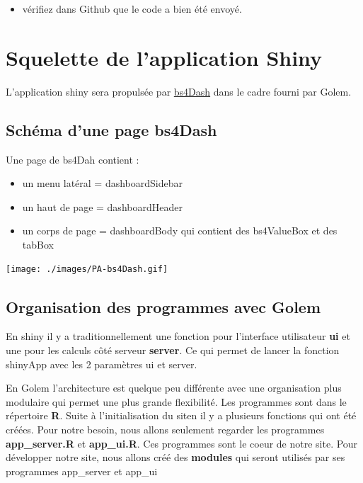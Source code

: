 \documentclass[
  letterpaper,
  DIV=11,
  numbers=noendperiod]{scrreprt}
\providecommand{\tightlist}{%
  \setlength{\itemsep}{0pt}\setlength{\parskip}{0pt}}\usepackage{longtable,booktabs,array}
\begin{document}
\begin{itemize}
\tightlist
\item
  vérifiez dans Github que le code a bien été envoyé.
\end{itemize}


\hypertarget{squelette-de-lapplication-shiny}{%
\chapter{Squelette de l'application
Shiny}\label{squelette-de-lapplication-shiny}}

L'application shiny sera propulsée par
\href{https://rinterface.github.io/bs4Dash/index.html}{bs4Dash} dans le
cadre fourni par Golem.

\hypertarget{schuxe9ma-dune-page-bs4dash}{%
\section{Schéma d'une page bs4Dash}\label{schuxe9ma-dune-page-bs4dash}}

Une page de bs4Dah contient :

\begin{itemize}
\tightlist
\item
  un menu latéral = dashboardSidebar\\
\item
  un haut de page = dashboardHeader\\
\item
  un corps de page = dashboardBody qui contient des bs4ValueBox et des
  tabBox
\end{itemize}

\texttt{[image: ./images/PA-bs4Dash.gif]}

\hypertarget{organisation-des-programmes-avec-golem}{%
\section{Organisation des programmes avec
Golem}\label{organisation-des-programmes-avec-golem}}

En shiny il y a traditionnellement une fonction pour l'interface
utilisateur \textbf{ui} et une pour les calculs côté serveur
\textbf{server}. Ce qui permet de lancer la fonction shinyApp avec les 2
paramètres ui et server.

En Golem l'architecture est quelque peu différente avec une organisation
plus modulaire qui permet une plus grande flexibilité. Les programmes
sont dans le répertoire \textbf{R}. Suite à l'initialisation du siten il
y a plusieurs fonctions qui ont été créées. Pour notre besoin, nous
allons seulement regarder les programmes \textbf{app\_server.R} et
\textbf{app\_ui.R}. Ces programmes sont le coeur de notre site. Pour
développer notre site, nous allons créé des \textbf{modules} qui seront
utilisés par ses programmes app\_server et app\_ui
\end{document}
